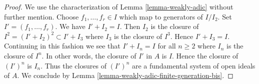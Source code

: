 \documentclass{stacks-project}
\theoremstyle{plain}
\theoremstyle{definition}
\theoremstyle{remark}
\numberwithin{equation}{subsection}
\begin{document}
\begin{proof}
We use the characterization of Lemma \ref{lemma-weakly-adic}
without further mention.
Choose $f_1, \ldots, f_r \in I$ which map to generators of $I/I_2$.
Set $I' = (f_1, \ldots, f_r)$. We have $I' + I_2 = I$.
Then $I_2$ is the closure of $I^2 = (I' + I_2)^2 \subset I' + I_3$
where $I_3$ is the closure of $I^3$. Hence $I' + I_3 = I$.
Continuing in this fashion we see that $I' + I_n = I$ for all $n \geq 2$
where $I_n$ is the closure of $I^n$.
In other words, the closure of $I'$ in $A$ is $I$.
Hence the closure of $(I')^n$ is $I_n$. Thus the closures of $(I')^n$
are a fundamental system of open ideals of $A$.
We conclude by Lemma \ref{lemma-weakly-adic-finite-generation-bis}.
\end{proof}
\end{document}
